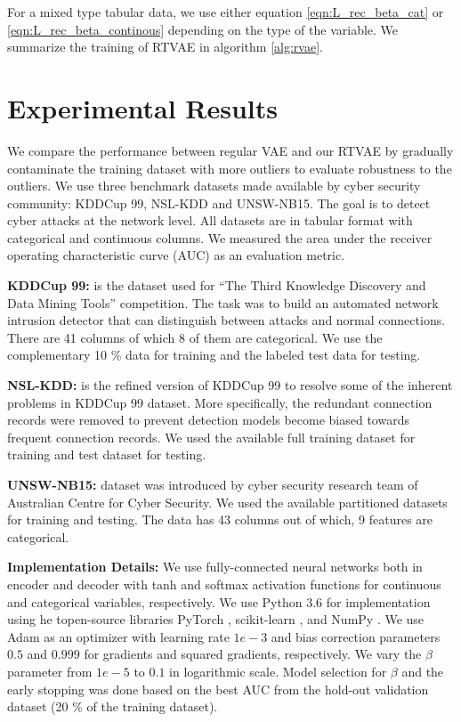 \documentclass{article}
\theoremstyle{plain}
\theoremstyle{definition}
\begin{document}
For a mixed type tabular data, we use either equation \ref{eqn:L_rec_beta_cat} or \ref{eqn:L_rec_beta_continous} depending on the type of the variable. We summarize the training of RTVAE in algorithm \ref{alg:rvae}.

\section{Experimental Results}
We compare the performance between regular VAE and our RTVAE by gradually contaminate the training dataset with more outliers to evaluate robustness to the outliers. We use three benchmark datasets made available by cyber security community: KDDCup 99, NSL-KDD and UNSW-NB15. The goal is to detect cyber attacks at the network level. All datasets are in tabular format with categorical and continuous columns. We measured the area under the receiver operating characteristic curve (AUC) as an evaluation metric. 

\textbf{KDDCup 99:} \cite{kdd99} is the dataset used for ``The Third Knowledge Discovery and Data Mining Tools'' competition. The task was to build an automated network intrusion detector that can distinguish between attacks and normal connections. There are 41 columns of which 8 of them are categorical. We use the complementary 
10 \% data for training and the labeled test data for testing.

\textbf{NSL-KDD:} \cite{nslkdd} is the refined version of KDDCup 99 to resolve some of the inherent problems in KDDCup 99 dataset. More specifically, the redundant connection records were removed to prevent detection models become biased towards frequent connection records. We used the available full training dataset for training and test dataset for testing.

\textbf{UNSW-NB15:} \cite{unsw} dataset was introduced by cyber security research team of Australian Centre for Cyber Security. We used the available partitioned datasets for training and testing. The data has 43 columns out of which, 9 features are categorical. 

\textbf{Implementation Details:} We use fully-connected neural networks both in encoder and decoder with \textrm{tanh} and \textrm{softmax} activation functions for continuous and categorical variables, respectively. We use Python 3.6 for implementation \cite{oliphant2007python} using he topen-source libraries PyTorch \cite{paszke2019pytorch}, scikit-learn \cite{pedregosa2011scikit},  and NumPy \cite{walt2011numpy}. We use Adam \cite{kingma2014adam} as an optimizer with learning rate $1e-3$ and bias correction parameters $0.5$ and $0.999$ for gradients and squared gradients, respectively. We vary the $\beta$ parameter from $1 e-5$ to $0.1$ in logarithmic scale. Model selection for $\beta$ and the early stopping was done based on the best AUC from the hold-out validation dataset (20 \% of the training dataset).
\end{document}
